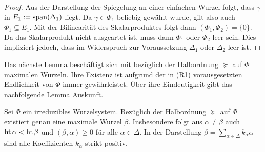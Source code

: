 \begin{proof}
  Aus der Darstellung der Spiegelung an einer einfachen Wurzel folgt, dass $\gamma$ in $E_1 := \operatorname{span}(\Delta_1)$ liegt.
  Da $\gamma \in \Phi_1$ beliebig gewählt wurde, gilt also auch $\Phi_1 \subseteq E_1$.
  Mit der Bilinearität des Skalarproduktes folgt dann $(\Phi_1, \Phi_2) = \{0\}$.
  Da das Skalarprodukt nicht ausgeartet ist, muss dann $\Phi_1$ oder $\Phi_2$ leer sein.
  Dies impliziert jedoch, dass im Widerspruch zur Voraussetzung $\Delta_1$ oder $\Delta_2$ leer ist.
\end{proof}

\newpage
Das nächste Lemma beschäftigt sich mit bezüglich der Halbordnung $\succeq$ auf $\Phi$ maximalen Wurzeln. 
Ihre Existenz ist aufgrund der in \hyperref[it:R1]{(R1)} vorausgesetzten Endlichkeit von $\Phi$ immer gewährleistet. 
Über ihre Eindeutigkeit gibt das nachfolgende Lemma Auskunft.

\begin{lem}
  \label{lem:maximalRoot}
  Sei $\Phi$ ein irreduzibles Wurzelsystem.
  Bezüglich der Halbordnung $\succeq$ auf $\Phi$ existiert genau eine maximale Wurzel $\beta$.
  Insbesondere folgt aus $\alpha \neq \beta$ auch $\operatorname{ht} \alpha < \operatorname{ht} \beta$ und $(\beta, \alpha) \geq 0$ für alle $\alpha \in \Delta$.
  In der Darstellung $\beta = \sum_{\alpha \in \Delta} k_\alpha \alpha$ sind alle Koeffizienten $k_\alpha$ strikt positiv.
\end{lem}

